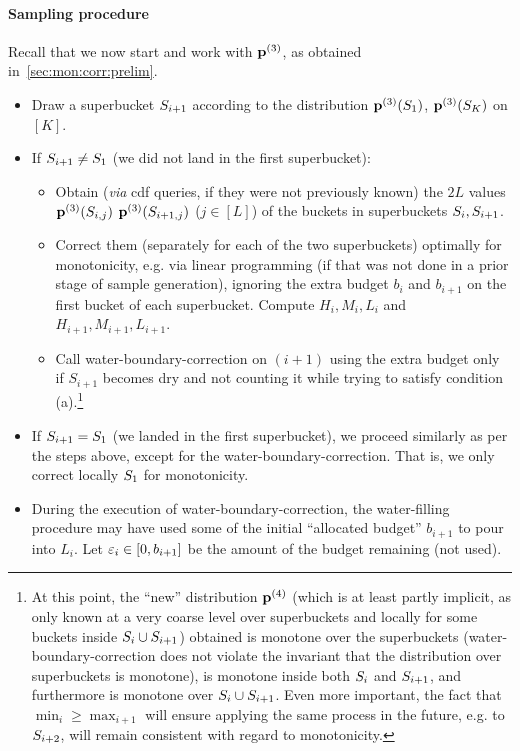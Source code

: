 \paragraph{Sampling procedure}
Recall that we now start and work with $\mathbf{p}^{(3)}$, as obtained in~\cref{sec:mon:corr:prelim}.
\begin{itemize}
  \item Draw a superbucket $S_{i+1}$ according to the distribution $\mathbf{p}^{(3)}(S_1)$, $\mathbf{p}^{(3)}(S_K)$ on $[K]$.
    \item If $S_{i+1} \neq S_1$ (we did not land in the first superbucket):
  \begin{itemize}
    \item Obtain (\textit{via} cdf queries, if they were not previously known) the $2L$ values  $\mathbf{p}^{(3)}(S_{i,j})$ $\mathbf{p}^{(3)}(S_{i+1,j})$ ($j\in[L]$) of the buckets in superbuckets $S_{i},S_{i+1}$.
    \item Correct them (separately for each of the two superbuckets) optimally for monotonicity, e.g. via linear programming (if that was not done in a prior stage of sample generation), {ignoring} the extra budget $b_{i}$ and $b_{i+1}$ on the first bucket of each superbucket. Compute $H_i,M_i,L_i$ and $H_{i+1},M_{i+1},L_{i+1}$.
    \item Call \textsf{water-boundary-correction} on $(i+1)$ {using the extra budget only if $S_{i+1}$ becomes dry and not counting it while trying to satisfy condition \textsf{(a)}.}\footnote{At this point, the ``new'' distribution $\mathbf{p}^{(4)}$ (which is at least partly implicit, as only known at a very coarse level over superbuckets and locally for some buckets inside $S_i\cup S_{i+1}$) obtained is monotone over the superbuckets (\textsf{water-boundary-correction} does not violate the invariant that the distribution over superbuckets is monotone), is monotone inside both $S_i$ and $S_{i+1}$, and furthermore is monotone over $S_i\cup S_{i+1}$. Even more important, the fact that $\min_i \geq \max_{i+1}$ will ensure applying the same process in the future, e.g. to $S_{i+2}$, will remain consistent with regard to monotonicity.}
  \end{itemize}
  \item {If $S_{i+1} = S_1$ (we landed in the first superbucket), we proceed similarly as per the steps above, except for the \textsf{water-boundary-correction}. That is, we only correct locally $S_1$ for monotonicity.}
  \item During the execution of \textsf{water-boundary-correction}, the water-filling procedure may have used some of the initial ``allocated budget'' $b_{i+1}$ to pour into $L_i$. Let $\varepsilon_i \in [0,b_{i+1}]$ be the amount of the budget remaining (not used).

\end{itemize}
